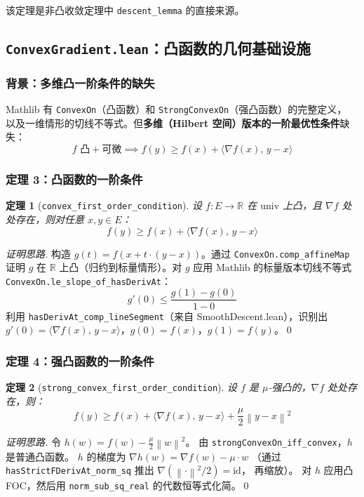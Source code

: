 \documentclass[12pt, a4paper]{article}
\newtheorem{theorem}{定理}[section]
\newcommand{\R}{\mathbb{R}}
\newcommand{\ip}[2]{\langle #1,\, #2 \rangle}
\newcommand{\norm}[1]{\left\| #1 \right\|}
\newcommand{\lean}[1]{\texttt{#1}}
\newcommand{\file}[1]{\textbf{\texttt{#1}}}
\begin{document}
该定理是非凸收敛定理中 \lean{descent\_lemma} 的直接来源。

\subsection{\file{ConvexGradient.lean}：凸函数的几何基础设施}

\subsubsection{背景：多维凸一阶条件的缺失}

Mathlib 有 \lean{ConvexOn}（凸函数）和 \lean{StrongConvexOn}（强凸函数）的完整定义，
以及一维情形的切线不等式。但\textbf{多维（Hilbert 空间）版本的一阶最优性条件}缺失：
\[
  f \text{ 凸} + \text{可微} \implies f(y) \geq f(x) + \ip{\nabla f(x)}{y - x}
\]

\subsubsection{定理 3：凸函数的一阶条件}

\begin{theorem}[\lean{convex\_first\_order\_condition}]
设 $f : E \to \R$ 在 $\text{univ}$ 上凸，且 $\nabla f$ 处处存在，则对任意 $x, y \in E$：
\[
  f(y) \geq f(x) + \ip{\nabla f(x)}{y - x}
\]
\end{theorem}

\begin{proof}[证明思路]
构造 $g(t) = f(x + t \cdot (y-x))$。通过 \lean{ConvexOn.comp\_affineMap} 证明 $g$
在 $\R$ 上凸（归约到标量情形）。对 $g$ 应用 Mathlib 的标量版本切线不等式
\lean{ConvexOn.le\_slope\_of\_hasDerivAt}：
\[
  g'(0) \leq \frac{g(1) - g(0)}{1 - 0}
\]
利用 \lean{hasDerivAt\_comp\_lineSegment}（来自 SmoothDescent.lean），识别出
$g'(0) = \ip{\nabla f(x)}{y - x}$，$g(0) = f(x)$，$g(1) = f(y)$。\qed
\end{proof}

\subsubsection{定理 4：强凸函数的一阶条件}

\begin{theorem}[\lean{strong\_convex\_first\_order\_condition}]
设 $f$ 是 $\mu$-强凸的，$\nabla f$ 处处存在，则：
\[
  f(y) \geq f(x) + \ip{\nabla f(x)}{y - x} + \frac{\mu}{2}\norm{y - x}^2
\]
\end{theorem}

\begin{proof}[证明思路]
令 $h(w) = f(w) - \frac{\mu}{2}\norm{w}^2$。
由 \lean{strongConvexOn\_iff\_convex}，$h$ 是普通凸函数。
$h$ 的梯度为 $\nabla h(w) = \nabla f(w) - \mu \cdot w$
（通过 \lean{hasStrictFDerivAt\_norm\_sq} 推出 $\nabla(\norm{\cdot}^2/2) = \mathrm{id}$，
再缩放）。
对 $h$ 应用凸 FOC，然后用 \lean{norm\_sub\_sq\_real} 的代数恒等式化简。\qed
\end{proof}
\end{document}
